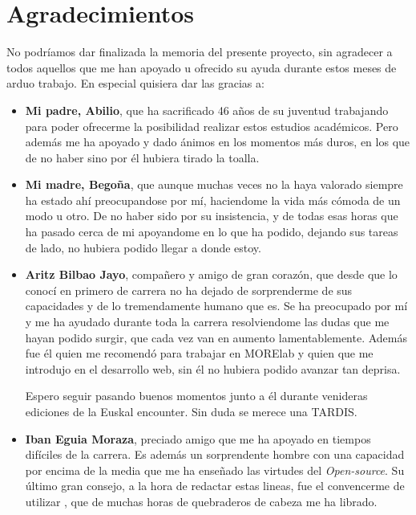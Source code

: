 \chapter*{Agradecimientos}

No podríamos dar finalizada la memoria del presente proyecto, sin agradecer a todos aquellos que me han apoyado u ofrecido su ayuda durante estos meses de arduo trabajo.
En especial quisiera dar las gracias a: 

\begin{itemize}
	\item \textbf{Mi padre, Abilio}, que ha sacrificado 46 años de su juventud trabajando para poder ofrecerme la posibilidad realizar estos estudios académicos. Pero además me ha apoyado y dado ánimos en los momentos más duros, en los que de no haber sino por él hubiera tirado la toalla.

	\item \textbf{Mi madre, Begoña}, que aunque muchas veces no la haya valorado siempre ha estado ahí preocupandose por mí, haciendome la vida más cómoda de un modo u otro. De no haber sido por su insistencia, y de todas esas horas que ha pasado cerca de mi apoyandome en lo que ha podido, dejando sus tareas de lado, no hubiera podido llegar a donde estoy.

	\item \textbf{Aritz Bilbao Jayo}, compañero y amigo de gran corazón, que desde que lo conocí en primero de carrera no ha dejado de sorprenderme de sus capacidades y de lo tremendamente humano que es. Se ha preocupado por mí y me ha ayudado durante toda la carrera resolviendome las dudas que me hayan podido surgir, que cada vez van en aumento lamentablemente. 
	Además fue él quien me recomendó para trabajar en MORElab y quien que me introdujo en el desarrollo web, sin él no hubiera podido avanzar tan deprisa.
	
	Espero seguir pasando buenos momentos junto a él durante venideras ediciones de la Euskal encounter. Sin duda se merece una TARDIS.

	\item \textbf{Iban Eguia Moraza}, preciado amigo que me ha apoyado en tiempos difíciles de la carrera. Es además un sorprendente hombre con una capacidad por encima de la media que me ha enseñado las virtudes del \textit{Open-source}. Su último gran consejo, a la hora de redactar estas lineas, fue el convencerme de utilizar , que de muchas horas de quebraderos de cabeza me ha librado.
	

\end{itemize}
